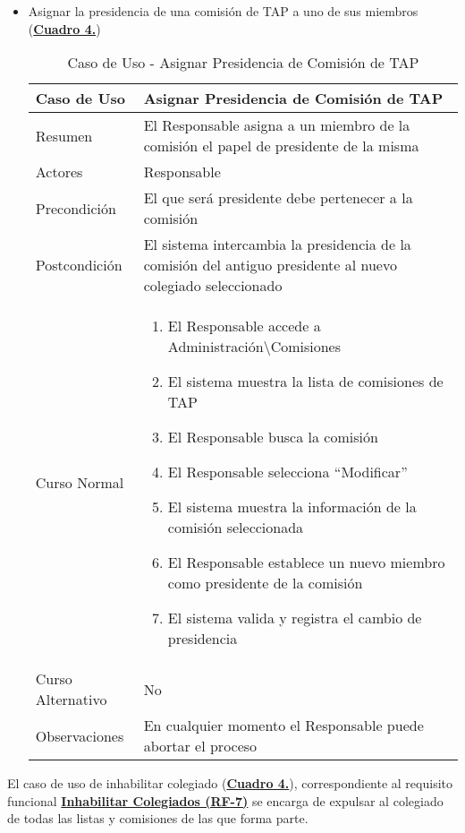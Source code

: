 \begin{itemize}
  \pagebreak
	\item \addtocounter{tabla}{1} Asignar la presidencia de una comisión de TAP a uno de sus miembros (\textbf{\hyperref[tab:curAsignarPresidenciaComisionTAP]{Cuadro 4.}})
		\begin{table}[!htbp]
		  \centering \addtocounter{casouso}{1}
		  \begin{tabular}{|l | p{100mm}|}
		    \textbf{Caso de Uso}  & \textbf{Asignar Presidencia de Comisión de TAP} \\ \hline
		    Resumen 		 & El Responsable asigna a un miembro de la comisión el papel de presidente de la misma \\ \hline
		    Actores  		 & Responsable \\ \hline
		    Precondición  	 & El que será presidente debe pertenecer a la comisión \\ \hline
		    Postcondición  	 & El sistema intercambia la presidencia de la comisión del antiguo presidente al nuevo colegiado seleccionado \\ \hline
		    Curso Normal   	 & \begin{enumerate}
			  \item El Responsable accede a Administración\textbackslash Comisiones
			  \item El sistema muestra la lista de comisiones de TAP
			  \item El Responsable busca la comisión
			  \item El Responsable selecciona ``Modificar''
			  \item El sistema muestra la información de la comisión seleccionada
			  \item El Responsable establece un nuevo miembro como presidente de la comisión
			  \item El sistema valida y registra el cambio de presidencia
		    \end{enumerate}  \\ \hline
		    Curso Alternativo  & No  \\ \hline
		    Observaciones 	 & En cualquier momento el Responsable puede abortar el proceso  \\ \hline
		  \end{tabular}
		  \caption{Caso de Uso  - Asignar Presidencia de Comisión de TAP}
		  \label{tab:curAsignarPresidenciaComisionTAP}
		\end{table}
		\FloatBarrier
\end{itemize}

\pagebreak
\addtocounter{tabla}{1}
El caso de uso de inhabilitar colegiado (\textbf{\hyperref[tab:curInhabilitar]{Cuadro 4.}}), correspondiente al requisito funcional \textbf{\hyperref[tab:rfInhabilitar]{Inhabilitar Colegiados (RF-7)}} se encarga de expulsar al colegiado de todas las listas y comisiones de las que forma parte.

